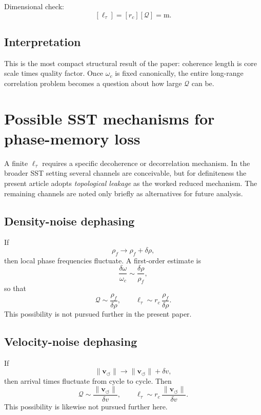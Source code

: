 \documentclass[11pt]{article}
\newcommand{\vnorm}{\lVert \mathbf{v}_{\!\boldsymbol{\circlearrowleft}}\rVert}
\newcommand{\rhoF}{\rho_{\!f}}
\newcommand{\rc}{r_c}
\begin{document}
        Dimensional check:
        \[
            [\ell_\tau]=[\rc][\mathcal{Q}]=\mathrm{m}.
        \]
        
        \subsection*{Interpretation}
            This is the most compact structural result of the paper: coherence length is core scale times quality factor. Once \(\omega_c\) is fixed canonically, the entire long-range correlation problem becomes a question about how large \(\mathcal{Q}\) can be.
    
    \section{Possible SST mechanisms for phase-memory loss}
        
        A finite \(\ell_\tau\) requires a specific decoherence or decorrelation mechanism. In the broader SST setting several channels are conceivable, but for definiteness the present article adopts \emph{topological leakage} as the worked reduced mechanism. The remaining channels are noted only briefly as alternatives for future analysis.
        
        \subsection{Density-noise dephasing}
            If
            \[
                \rhoF\to \rhoF+\delta\rho,
            \]
            then local phase frequencies fluctuate. A first-order estimate is
            \begin{equation}
                \frac{\delta\omega}{\omega_c}\sim \frac{\delta\rho}{\rhoF},
            \end{equation}
            so that
            \begin{equation}
                \mathcal{Q}\sim \frac{\rhoF}{\delta\rho},
                \qquad
                \ell_\tau\sim \rc\,\frac{\rhoF}{\delta\rho}.
                \label{eq:Q_density}
            \end{equation}
            This possibility is not pursued further in the present paper.
        
        \subsection{Velocity-noise dephasing}
            If
            \[
                \vnorm\to \vnorm+\delta v,
            \]
            then arrival times fluctuate from cycle to cycle. Then
            \begin{equation}
                \mathcal{Q}\sim \frac{\vnorm}{\delta v},
                \qquad
                \ell_\tau\sim \rc\,\frac{\vnorm}{\delta v}.
                \label{eq:Q_velocity}
            \end{equation}
            This possibility is likewise not pursued further here.
        
\end{document}
